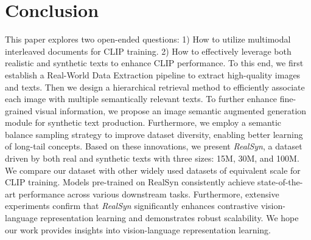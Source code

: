 \section{Conclusion}
This paper explores two open-ended questions: 1) How to utilize multimodal interleaved documents for CLIP training. 2) How to effectively leverage both realistic and synthetic texts to enhance CLIP performance. To this end, we first establish a Real-World Data Extraction pipeline to extract high-quality images and texts. Then we design a hierarchical retrieval method to efficiently associate each image with multiple semantically relevant texts. To further enhance fine-grained visual information, we propose an image semantic augmented generation module for synthetic text production. Furthermore, we employ a semantic balance sampling strategy to improve dataset diversity, enabling better learning of long-tail concepts. Based on these innovations, we present \textit{RealSyn}, a dataset driven by both real and synthetic texts with three sizes: 15M, 30M, and 100M. We compare our dataset with other widely used datasets of equivalent scale for CLIP training. Models pre-trained on RealSyn consistently achieve state-of-the-art performance across various downstream tasks. Furthermore, extensive experiments confirm that \textit{RealSyn} significantly enhances contrastive vision-language representation learning and demonstrates robust scalability. We hope our work provides insights into vision-language representation learning.